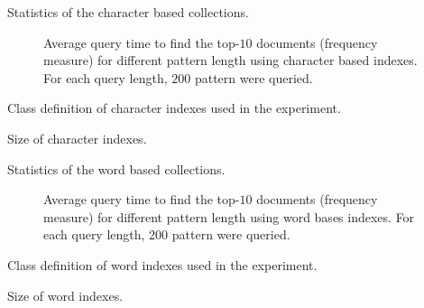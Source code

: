 \documentclass[9pt,a4paper]{scrartcl}
\begin{document}
\pagestyle{empty}

\begin{table}
\centering

\caption{Statistics of the character based collections.}
\end{table}

\begin{figure}

\caption{Average query time to find the top-$10$ documents (frequency measure)
for different pattern length using character based indexes. For each query length, $200$ pattern were
queried.}
\end{figure}

\begin{table}
\centering

\caption{Class definition of character indexes used in the experiment.}
\end{table}

\begin{table}
\centering

\caption{Size of character indexes.}
\end{table}

\begin{table}
\centering

\caption{Statistics of the word based collections.}
\end{table}

\begin{figure}

\caption{Average query time to find the top-$10$ documents (frequency measure)
for different pattern length using word bases indexes. For each query length, $200$ pattern were
queried.}
\end{figure}


\begin{table}
\centering

\caption{Class definition of word indexes used in the experiment.}
\end{table}

\begin{table}
\centering

\caption{Size of word indexes.}
\end{table}
\end{document}
